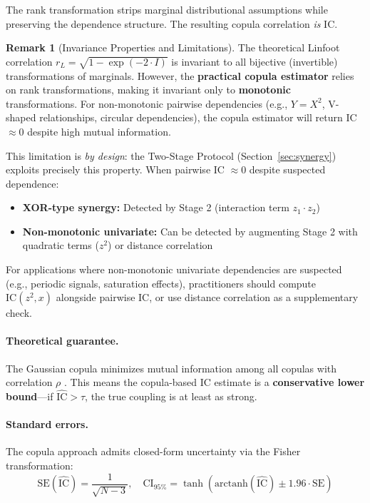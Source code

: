 \documentclass[10pt]{article} %
\theoremstyle{plain}
\theoremstyle{definition}
\newtheorem{remark}[theorem]{Remark}
\newcommand{\IC}{\mathrm{IC}}  %
\newcommand{\MI}{I}
\begin{document}
The rank transformation strips marginal distributional assumptions while preserving the dependence structure. The resulting copula correlation \emph{is} IC.

\begin{remark}[Invariance Properties and Limitations]
\label{rem:monotonic-invariance}
The theoretical Linfoot correlation $r_L = \sqrt{1 - \exp(-2 \cdot \MI)}$ is invariant to all bijective (invertible) transformations of marginals. However, the \textbf{practical copula estimator} relies on rank transformations, making it invariant only to \textbf{monotonic} transformations. For non-monotonic pairwise dependencies (e.g., $Y = X^2$, V-shaped relationships, circular dependencies), the copula estimator will return IC $\approx 0$ despite high mutual information.

This limitation is \emph{by design}: the Two-Stage Protocol (Section~\ref{sec:synergy}) exploits precisely this property. When pairwise IC $\approx 0$ despite suspected dependence:
\begin{itemize}[nosep]
    \item \textbf{XOR-type synergy:} Detected by Stage 2 (interaction term $z_1 \cdot z_2$)
    \item \textbf{Non-monotonic univariate:} Can be detected by augmenting Stage 2 with quadratic terms ($z^2$) or distance correlation
\end{itemize}
For applications where non-monotonic univariate dependencies are suspected (e.g., periodic signals, saturation effects), practitioners should compute $\IC(z^2, x)$ alongside pairwise IC, or use distance correlation \citep{szekely2007measuring} as a supplementary check.
\end{remark}

\paragraph{Theoretical guarantee.} The Gaussian copula minimizes mutual information among all copulas with correlation $\rho$ \citep{joe1989estimation}. This means the copula-based IC estimate is a \textbf{conservative lower bound}---if $\widehat{\IC} > \tau$, the true coupling is at least as strong.

\paragraph{Standard errors.} The copula approach admits closed-form uncertainty via the Fisher transformation:
\begin{equation}
\text{SE}(\widehat{\IC}) = \frac{1}{\sqrt{N-3}}, \quad \text{CI}_{95\%} = \tanh\left(\text{arctanh}(\widehat{\IC}) \pm 1.96 \cdot \text{SE}\right)
\end{equation}
\end{document}
